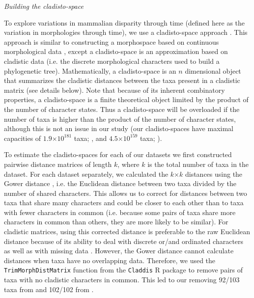\documentclass[12pt,letterpaper]{article}
\renewcommand{\subsection}[1]{%
\bigskip
\begin{center}
\begin{large}
\normalfont\itshape #1
\end{large}
\end{center}}
\begin{document}
\subsection{Building the cladisto-space} %
To explore variations in mammalian disparity through time (defined here as the variation in morphologies through time), we use a cladisto-space approach \citep[e.g.][]{Foote01071994,Foote29111996,Wesley-Hunt2005,Brusatte12092008,Hughes20082013,friedmanexplosive2010,toljagictriassic-jurassic2013}.
This approach is similar to constructing a morphospace based on continuous morphological data \citep[e.g.][]{friedmanexplosive2010}, except a cladisto-space is an approximation based on cladistic data (i.e. the discrete morphological characters used to build a phylogenetic tree).
Mathematically, a cladisto-space is an $n$ dimensional object that summarizes the cladistic distances between the taxa present in a cladistic matrix (see details below).
Note that because of its inherent combinatory properties, a cladisto-space is a finite theoretical object limited by the product of the number of character states. Thus a cladisto-space will be overloaded if the number of taxa is higher than the product of the number of character states, although this is not an issue in our study (our cladisto-spaces have maximal capacities of $1.9$$\times$$10^{181}$ taxa; \citealp{Slater2012MEE}, and $4.5$$\times$$10^{159}$ taxa; \citealp{beckancient2014}).  

To estimate the cladisto-spaces for each of our datasets we first constructed pairwise distance matrices of length $k$, where $k$ is the total number of taxa in the dataset. 
For each dataset separately, we calculated the $k$$\times$$k$ distances using the Gower distance \citep{Gower71}, i.e. the Euclidean distance between two taxa divided by the number of shared characters. 
This allows us to correct for distances between two taxa that share many characters and could be closer to each other than to taxa with fewer characters in common (i.e. because some pairs of taxa share more characters in common than others, they are more likely to be similar).
For cladistic matrices, using this corrected distance is preferable to the raw Euclidean distance because of its ability to deal with discrete or/and ordinated characters as well as with missing data \citep{anderson2012using}.
However, the Gower distance cannot calculate distances when taxa have no overlapping data.
Therefore, we used the \texttt{TrimMorphDistMatrix} function from the \texttt{Claddis} R package \citep{Claddis} to remove pairs of taxa with no cladistic characters in common.
This led to our removing 92/103 taxa from \cite{Slater2012MEE} and 102/102 from \cite{beckancient2014}.
\end{document}
